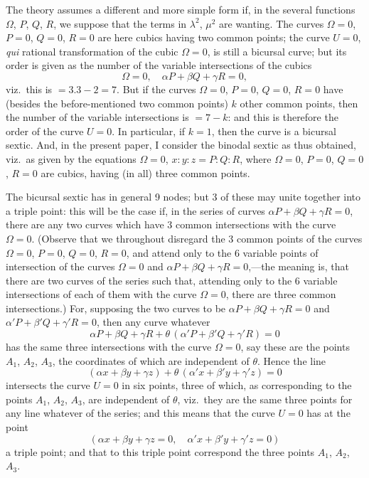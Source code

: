 \documentclass[12pt,a4paper]{article}
\begin{document}
The theory assumes a different and more simple form if, in the several functions $\Omega$, $P$, $Q$, $R$, we suppose that the terms in $\lambda^2$, $\mu^2$ are wanting. The curves $\Omega=0$, $P=0$, $Q=0$, $R=0$ are here cubics having two common points; the curve $U=0$, \textit{qui} rational transformation of the cubic $\Omega=0$, is still a bicursal curve; but its order is given as the number of the variable intersections of the cubics
\[
\Omega = 0, \quad \alpha P + \beta Q + \gamma R = 0,
\]
viz.\ this is $= 3.3 - 2 = 7$. But if the curves $\Omega=0$, $P=0$, $Q=0$, $R=0$ have (besides the before-mentioned two common points) $k$ other common points, then the number of the variable intersections is $=7-k$: and this is therefore the order of the curve $U=0$. In particular, if $k=1$, then the curve is a bicursal sextic. And, in the present paper, I consider the binodal sextic as thus obtained, viz.\ as given by the equations $\Omega=0$, $x:y:z = P:Q:R$, where $\Omega=0$, $P=0$, $Q=0$, $R=0$ are cubics, having (in all) three common points.

The bicursal sextic has in general 9 nodes; but 3 of these may unite together into a triple point: this will be the case if, in the series of curves $\alpha P + \beta Q + \gamma R = 0$, there are any two curves which have 3 common intersections with the curve $\Omega=0$. (Observe that we throughout disregard the 3 common points of the curves $\Omega=0$, $P=0$, $Q=0$, $R=0$, and attend only to the 6 variable points of intersection of the curves $\Omega=0$ and $\alpha P+\beta Q+\gamma R=0$,---the meaning is, that there are two curves of the series such that, attending only to the 6 variable intersections of each of them with the curve $\Omega=0$, there are three common intersections.) For, supposing the two curves to be $\alpha P+\beta Q+\gamma R=0$ and $\alpha' P+\beta' Q+\gamma' R=0$, then any curve whatever
\[
\alpha P + \beta Q + \gamma R + \theta\, (\alpha' P + \beta' Q + \gamma' R) = 0
\]
has the same three intersections with the curve $\Omega=0$, say these are the points $A_1$, $A_2$, $A_3$, the coordinates of which are independent of $\theta$. Hence the line
\[
(\alpha x + \beta y + \gamma z) + \theta\, (\alpha' x + \beta' y + \gamma' z) = 0
\]
intersects the curve $U=0$ in six points, three of which, as corresponding to the points $A_1$, $A_2$, $A_3$, are independent of $\theta$, viz.\ they are the same three points for any line whatever of the series; and this means that the curve $U=0$ has at the point
\[
(\alpha x + \beta y + \gamma z = 0,\quad \alpha' x + \beta' y + \gamma' z = 0)
\]
a triple point; and that to this triple point correspond the three points $A_1$, $A_2$, $A_3$.
\end{document}
